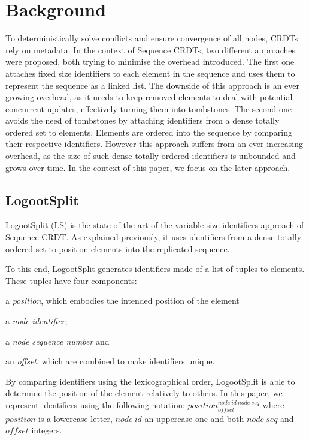 \documentclass[10pt,journal,compsoc]{IEEEtran}
\newcommand{\trm}[1]{\mathit{#1}}
\newcommand{\id}[3]{$\trm{#1}^{\trm{#2}}_{\trm{#3}}$}
\begin{document}

\section{Background}
\label{sec:background}

To deterministically solve conflicts and ensure convergence of all nodes, \acp{CRDT} rely on metadata.
In the context of Sequence \acp{CRDT}, two different approaches were proposed, both trying to minimise the overhead introduced.
The first one \cite{oster:inria-00108523, Weiss_2007, ROH2011354,briot:hal-01343941} attaches fixed size identifiers to each element in the sequence and uses them to represent the sequence as a linked list.
The downside of this approach is an ever growing overhead, as it needs to keep removed elements to deal with potential concurrent updates, effectively turning them into tombstones.
The second one \cite{5158449,WeissICDCS09,weiss:hal-00450416,AndreCollaborateCom2013,nedelec_2013_lseq,doi:10.1002/cpe.4108} avoids the need of tombstones by attaching identifiers from a dense totally ordered set to elements.
Elements are ordered into the sequence by comparing their respective identifiers.
However this approach suffers from an ever-increasing overhead, as the size of such dense totally ordered identifiers is unbounded and grows over time.
In the context of this paper, we focus on the later approach.


\subsection{LogootSplit}

LogootSplit (LS) \cite{AndreCollaborateCom2013} is the state of the art of the variable-size identifiers approach of Sequence \ac{CRDT}.
As explained previously, it uses identifiers from a dense totally ordered set to position elements into the replicated sequence.

To this end, LogootSplit generates identifiers made of a list of tuples to elements.
These tuples have four components:
\begin{enumerate*}
    \item a \emph{position}, which embodies the intended position of the element
    \item a \emph{node identifier},
    \item a \emph{node sequence number} and
    \item an \emph{offset}, which are combined to make identifiers unique.
\end{enumerate*}
By comparing identifiers using the lexicographical order, LogootSplit is able to determine the position of the element relatively to others.
In this paper, we represent identifiers using the following notation: \id{position}{node~id~node~seq}{offset} where $\trm{position}$ is a lowercase letter, $\trm{node~id}$ an uppercase one and both $\trm{node~seq}$ and $\trm{offset}$ integers.
\end{document}
